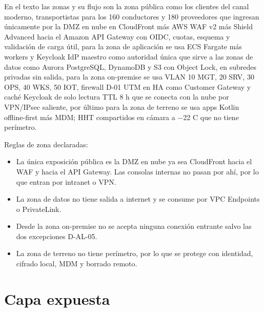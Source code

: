 En el texto las zonas y su flujo son la zona pública como los clientes del canal moderno, transportistas para los 160 conductores y 180 proveedores que ingresan únicamente por la DMZ en nube en CloudFront más AWS WAF v2 más Shield Advanced hacia el Amazon API Gateway con OIDC, cuotas, esquema y validación de carga útil, para la zona de aplicación se usa ECS Fargate más workers y Keycloak IdP maestro como autoridad única que sirve a las zonas de datos como Aurora PostgreSQL, DynamoDB y S3 con Object Lock, en subredes privadas sin salida, para la zona on-premise se usa VLAN 10 MGT, 20 SRV, 30 OPS, 40 WKS, 50 IOT, firewall D-01 UTM en HA como Customer Gateway y caché Keycloak de solo lectura TTL 8 h que se conecta con la nube por VPN/IPsec saliente, por último para la zona de terreno se usa apps Kotlin offline-first más MDM; HHT compartidos en cámara a $-$22 \textdegree{}C que no tiene perímetro.

Reglas de zona declaradas:

\begin{itemize}
  \item La única exposición pública es la DMZ en nube ya sea CloudFront hacia el WAF y hacia el API Gateway. Las consolas internas no pasan por ahí, por lo que entran por intranet o VPN.
  \item La zona de datos no tiene salida a internet y se consume por VPC Endpoints o PrivateLink.
  \item Desde la zona on-premise no se acepta ninguna conexión entrante salvo las dos excepciones D-AL-05.
  \item La zona de terreno no tiene perímetro, por lo que se protege con identidad, cifrado local, MDM y borrado remoto.
\end{itemize}

\section{Capa expuesta}
\label{sub:3-capa-expuesta-art-21-2-rt-11-11-11-13}

